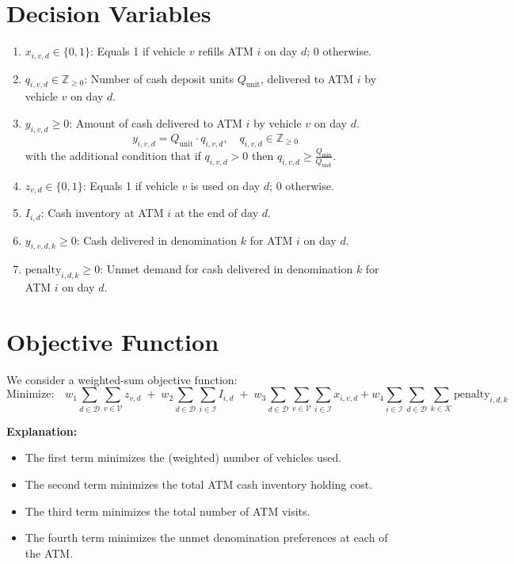 \documentclass[11pt]{article}
\begin{document}
\section*{Decision Variables}
\begin{enumerate}[leftmargin=1.25cm]
    \item \(\displaystyle x_{i,v,d} \in \{0,1\}\): Equals 1 if vehicle \(v\) refills ATM \(i\) on day \(d\); 0 otherwise.
    \item \(\displaystyle q_{i,v,d} \in \mathbb{Z}_{\geq 0}\): Number of cash deposit units \(Q_{\text{unit}}\), delivered to ATM \(i\) by vehicle \(v\) on day \(d\).
    \item \(\displaystyle y_{i,v,d} \ge 0\): Amount of cash delivered to ATM \(i\) by vehicle \(v\) on day \(d\).  
    \[
    y_{i,v,d} = Q_{\text{unit}} \cdot q_{i,v,d}, \quad q_{i,v,d} \in \mathbb{Z}_{\geq 0}
    \]
    with the additional condition that if \(q_{i,v,d} > 0\) then \(q_{i,v,d} \ge \frac{Q_{\min}}{Q_{\text{unit}}}\).
    \item \(\displaystyle z_{v,d} \in \{0,1\}\): Equals 1 if vehicle \(v\) is used on day \(d\); 0 otherwise.
    \item \(\displaystyle I_{i,d}\): Cash inventory at ATM \(i\) at the end of day \(d\).
    \item \(\displaystyle y_{i,v,d,k} \ge 0\): Cash delivered in denomination \(k\) for ATM \(i\) on day \(d\).
    \item \(\displaystyle \text{penalty}_{i,d,k} \geq 0\): Unmet demand for cash delivered in denomination \(k\) for ATM \(i\) on day \(d\).
\end{enumerate}

\section*{Objective Function}
We consider a weighted-sum objective function:
\begin{equation*}
    \text{Minimize:} \quad w_1 \sum_{d \in \mathcal{D}} \sum_{v \in \mathcal{V}} z_{v,d} \;+\; w_2 \sum_{d \in \mathcal{D}} \sum_{i \in \mathcal{I}} I_{i,d} \;+\; w_3 \sum_{d \in \mathcal{D}} \sum_{v \in \mathcal{V}} \sum_{i \in \mathcal{I}} x_{i,v,d} + w_4 \sum_{i \in \mathcal{I}}\sum_{d \in \mathcal{D}}\sum_{k \in \mathcal{K}} \text{penalty}_{i,d,k}
\end{equation*}

\noindent \textbf{Explanation:}
\begin{itemize}[leftmargin=1cm]
    \item The first term minimizes the (weighted) number of vehicles used.
    \item The second term minimizes the total ATM cash inventory holding cost.
    \item The third term minimizes the total number of ATM visits.
    \item The fourth term minimizes the unmet denomination preferences at each of the ATM.
\end{itemize}
\end{document}
